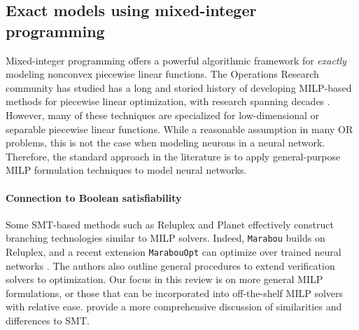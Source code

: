 \subsection{Exact models using mixed-integer programming}
\label{sec:MIPmodels}

Mixed-integer programming offers a powerful algorithmic framework for \emph{exactly} modeling nonconvex piecewise linear functions. The Operations Research community has studied has a long and storied history of developing MILP-based methods for piecewise linear optimization, with research spanning decades \citep{croxton2003comparison,dantzig1960significance,geissler2012using,huchette2022nonconvex,lee2001polyhedral,misener2012global,padberg2000approximating,vielma2010mixed}.
However, many of these techniques are specialized for low-dimensional or separable piecewise linear functions. While a reasonable assumption in many OR problems, this is not the case when modeling neurons in a neural network. Therefore, the standard approach in the literature is to apply general-purpose MILP formulation techniques to model neural networks.

\paragraph{Connection to Boolean satisfiability}
Some SMT-based methods such as Reluplex \citep{katz2017reluplex} and Planet \citep{ehlers2017formal} effectively construct branching technologies similar to MILP solvers. 
Indeed, \texttt{Marabou} \citep{katz2019marabou} builds on Reluplex, and a recent extension \texttt{MarabouOpt} can optimize over trained neural networks \citep{strong2021global}. 
The authors also outline general procedures to extend verification solvers to optimization. 
Our focus in this review is on more general MILP formulations, or those that can be incorporated into off-the-shelf MILP solvers with relative ease. 
\cite{bunel2020branch,bunel2018unified} provide a more comprehensive discussion of similarities and differences to SMT. 


